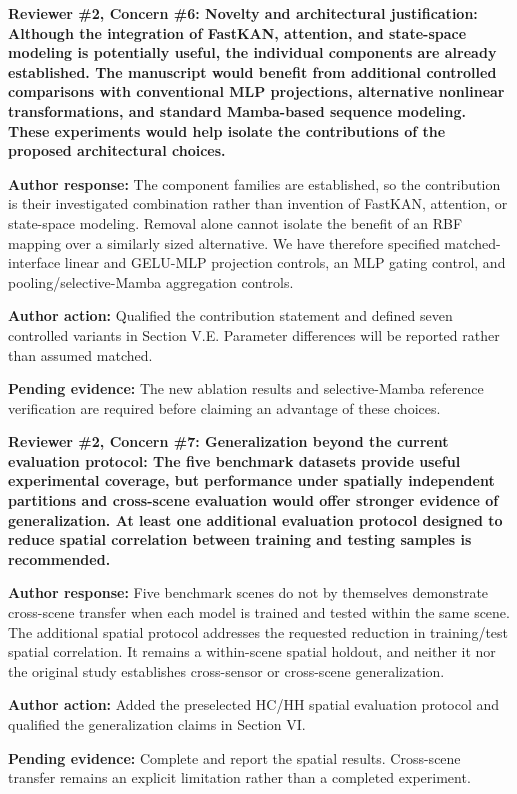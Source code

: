 \documentclass[a4paper,onecolumn,11pt]{IEEEtran}
\newcommand{\pending}[1]{\par\noindent\textcolor{red!70!black}{\textbf{Pending evidence:} #1}\par}
\begin{document}
\vspace{1.5em}
{\color{reviewgreen}\textbf{Reviewer \#2, Concern \#6: Novelty and architectural justification: Although the integration of FastKAN, attention, and state-space modeling is potentially useful, the individual components are already established. The manuscript would benefit from additional controlled comparisons with conventional MLP projections, alternative nonlinear transformations, and standard Mamba-based sequence modeling. These experiments would help isolate the contributions of the proposed architectural choices. }}

\textbf{Author response:}
The component families are established, so the contribution is their investigated combination rather than invention of FastKAN, attention, or state-space modeling. Removal alone cannot isolate the benefit of an RBF mapping over a similarly sized alternative. We have therefore specified matched-interface linear and GELU-MLP projection controls, an MLP gating control, and pooling/selective-Mamba aggregation controls.

\textbf{Author action:}
Qualified the contribution statement and defined seven controlled variants in Section V.E. Parameter differences will be reported rather than assumed matched. \pending{The new ablation results and selective-Mamba reference verification are required before claiming an advantage of these choices.}

\vspace{1.5em}
{\color{reviewgreen}\textbf{Reviewer \#2, Concern \#7: Generalization beyond the current evaluation protocol: The five benchmark datasets provide useful experimental coverage, but performance under spatially independent partitions and cross-scene evaluation would offer stronger evidence of generalization. At least one additional evaluation protocol designed to reduce spatial correlation between training and testing samples is recommended. }}

\textbf{Author response:}
Five benchmark scenes do not by themselves demonstrate cross-scene transfer when each model is trained and tested within the same scene. The additional spatial protocol addresses the requested reduction in training/test spatial correlation. It remains a within-scene spatial holdout, and neither it nor the original study establishes cross-sensor or cross-scene generalization.

\textbf{Author action:}
Added the preselected HC/HH spatial evaluation protocol and qualified the generalization claims in Section VI. \pending{Complete and report the spatial results. Cross-scene transfer remains an explicit limitation rather than a completed experiment.}
\end{document}
